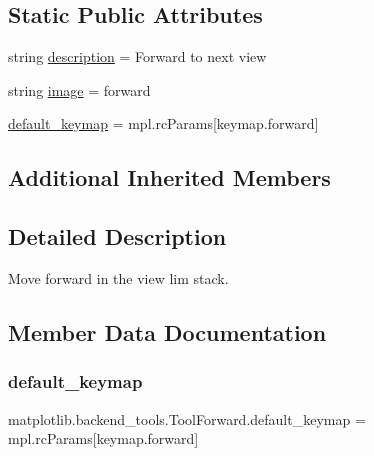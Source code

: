 \subsection*{Static Public Attributes}
\begin{DoxyCompactItemize}
\item 
string \hyperlink{classmatplotlib_1_1backend__tools_1_1ToolForward_a64508aa861bc10f17f399c29547430b3}{description} = \textquotesingle{}Forward to next view\textquotesingle{}
\item 
string \hyperlink{classmatplotlib_1_1backend__tools_1_1ToolForward_a038b0fa961ccc14fb54a2cbbea0b4a2b}{image} = \textquotesingle{}forward\textquotesingle{}
\item 
\hyperlink{classmatplotlib_1_1backend__tools_1_1ToolForward_a2045276f6a058e3603202a0dfbce4b6a}{default\+\_\+keymap} = mpl.\+rc\+Params\mbox{[}\textquotesingle{}keymap.\+forward\textquotesingle{}\mbox{]}
\end{DoxyCompactItemize}
\subsection*{Additional Inherited Members}


\subsection{Detailed Description}
\begin{DoxyVerb}Move forward in the view lim stack.\end{DoxyVerb}
 

\subsection{Member Data Documentation}
\mbox{\label{classmatplotlib_1_1backend__tools_1_1ToolForward_a2045276f6a058e3603202a0dfbce4b6a}} 
\subsubsection{\texorpdfstring{default\+\_\+keymap}{default\_keymap}}
{\footnotesize\ttfamily matplotlib.\+backend\+\_\+tools.\+Tool\+Forward.\+default\+\_\+keymap = mpl.\+rc\+Params\mbox{[}\textquotesingle{}keymap.\+forward\textquotesingle{}\mbox{]}\hspace{0.3cm}{\ttfamily [static]}}

